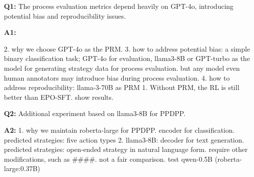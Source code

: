 \textbf{Q1:} The process evaluation metrics depend heavily on GPT-4o, introducing potential bias and reproducibility issues.

\textbf{A1:}

2. why we choose GPT-4o as the PRM.
3. how to address potential bias: a simple binary classification task; GPT-4o for evaluation, llama3-8B or GPT-turbo as the model for generating strategy data for process evaluation. but any model even human annotators may introduce bias during process evaluation.
4. how to address reproducibility: llama-3-70B as PRM
1. Without PRM, the RL is still better than EPO-SFT. show results.


\textbf{Q2:} Additional experiment based on llama3-8B for PPDPP.

\textbf{A2:}
1. why we maintain roberta-large for PPDPP. encoder for classification. predicted strategies: five action types
2. llama3-8B: decoder for text generation. predicted strategies: open-ended strategy in natural language form. require other modifications, such as ####. not a fair comparison. 
test qwen-0.5B (roberta-large:0.37B)